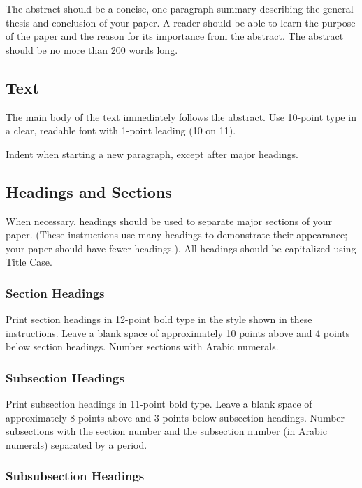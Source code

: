 \documentclass{article}
\begin{document}
The abstract should be a concise, one-paragraph summary describing the
general thesis and conclusion of your paper. A reader should be able
to learn the purpose of the paper and the reason for its importance
from the abstract. The abstract should be no more than 200 words long.

\subsection{Text}

The main body of the text immediately follows the abstract. Use
10-point type in a clear, readable font with 1-point leading (10 on
11).

Indent when starting a new paragraph, except after major headings.

\subsection{Headings and Sections}

When necessary, headings should be used to separate major sections of
your paper. (These instructions use many headings to demonstrate their
appearance; your paper should have fewer headings.). All headings should be capitalized using Title Case.

\subsubsection{Section Headings}

Print section headings in 12-point bold type in the style shown in
these instructions. Leave a blank space of approximately 10 points
above and 4 points below section headings.  Number sections with
Arabic numerals.

\subsubsection{Subsection Headings}

Print subsection headings in 11-point bold type. Leave a blank space
of approximately 8 points above and 3 points below subsection
headings. Number subsections with the section number and the
subsection number (in Arabic numerals) separated by a
period.

\subsubsection{Subsubsection Headings}
\end{document}
